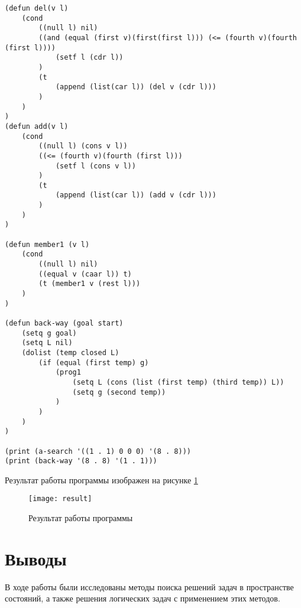 \documentclass[a4paper,14pt]{extarticle}
\begin{document}
\begin{lstlisting}
(defun del(v l) 
    (cond 
        ((null l) nil) 
        ((and (equal (first v)(first(first l))) (<= (fourth v)(fourth (first l)))) 
            (setf l (cdr l)) 
        ) 
        (t 
            (append (list(car l)) (del v (cdr l))) 
        ) 
    ) 
) 
(defun add(v l) 
    (cond 
        ((null l) (cons v l)) 
        ((<= (fourth v)(fourth (first l))) 
            (setf l (cons v l)) 
        ) 
        (t 
            (append (list(car l)) (add v (cdr l))) 
        ) 
    ) 
) 
  
(defun member1 (v l) 
    (cond 
        ((null l) nil) 
        ((equal v (caar l)) t) 
        (t (member1 v (rest l))) 
    ) 
) 
  
(defun back-way (goal start) 
    (setq g goal) 
    (setq L nil) 
    (dolist (temp closed L) 
        (if (equal (first temp) g) 
            (prog1 
                (setq L (cons (list (first temp) (third temp)) L)) 
                (setq g (second temp)) 
            ) 
        ) 
    ) 
) 
  
(print (a-search '((1 . 1) 0 0 0) '(8 . 8))) 
(print (back-way '(8 . 8) '(1 . 1))) 
\end{lstlisting}

Результат работы программы изображен на рисунке \ref{fig:result}

\begin{figure}[H]
    \centering
    \texttt{[image: result]}
    \caption{Результат работы программы}
    \label{fig:result}
\end{figure}

\section*{Выводы}
В ходе работы были исследованы методы поиска решений задач в пространстве
состояний, а также решения логических задач с применением этих методов.
\end{document}
